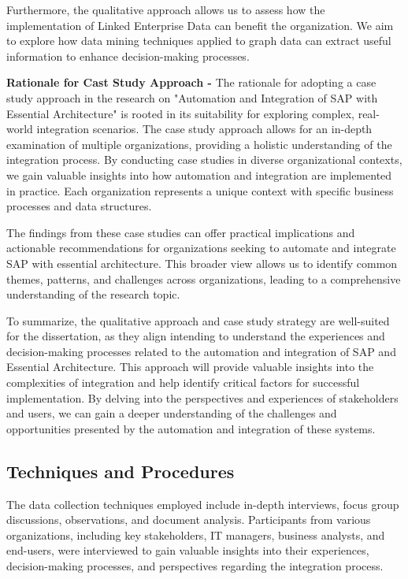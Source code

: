 \documentclass{article}
\begin{document}
Furthermore, the qualitative approach allows us to assess how the implementation of Linked Enterprise Data can benefit the organization. We aim to explore how data mining techniques applied to graph data can extract useful information to enhance decision-making processes.

\textbf{Rationale for Cast Study Approach -}
The rationale for adopting a case study approach in the research on "Automation and Integration of SAP with Essential Architecture" is rooted in its suitability for exploring complex, real-world integration scenarios. The case study approach allows for an in-depth examination of multiple organizations, providing a holistic understanding of the integration process. By conducting case studies in diverse organizational contexts, we gain valuable insights into how automation and integration are implemented in practice. Each organization represents a unique context with specific business processes and data structures.

The findings from these case studies can offer practical implications and actionable recommendations for organizations seeking to automate and integrate SAP with essential architecture. This broader view allows us to identify common themes, patterns, and challenges across organizations, leading to a comprehensive understanding of the research topic.

To summarize, the qualitative approach and case study strategy are well-suited for the dissertation, as they align intending to understand the experiences and decision-making processes related to the automation and integration of SAP and Essential Architecture. This approach will provide valuable insights into the complexities of integration and help identify critical factors for successful implementation. By delving into the perspectives and experiences of stakeholders and users, we can gain a deeper understanding of the challenges and opportunities presented by the automation and integration of these systems.

\maketitle
\subsection{Techniques and Procedures}
The data collection techniques employed include in-depth interviews, focus group discussions, observations, and document analysis. Participants from various organizations, including key stakeholders, IT managers, business analysts, and end-users, were interviewed to gain valuable insights into their experiences, decision-making processes, and perspectives regarding the integration process.
\end{document}
